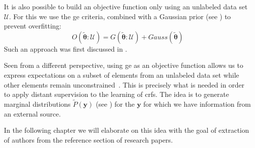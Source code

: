 It is also possible to build an \gls{objective function} only using an unlabeled data set $\mathcal{U}$.
For this we use the \gls{ge} criteria, combined with a Gaussian prior (see ) to prevent overfitting:
\begin{equation}
  \label{equ:objective-function-g}
  O(\bm{\tilde{\theta}}:\mathcal{U})=G(\bm{\tilde{\theta}}:\mathcal{U})+Gauss(\bm{\tilde{\theta}})
\end{equation}
Such an approach was first discussed in \citet{mann2008generalized}.

Seen from a different perspective, using \gls{ge} as an objective function allows us to express expectations on a subset of elements from an unlabeled data set while other elements remain unconstrained~\citep{mann2010generalized}.
This is precisely what is needed in order to apply \gls{distant supervision} to the learning of \glspl{crf}.
The idea is to generate \glspl{marginal distribution} $\tilde{P}(\mathbf{y})$ (see ) for the $\mathbf{y}$ for which we have information from an external source.

In the following chapter we will elaborate on this idea with the goal of extraction of authors from the reference section of research papers.

